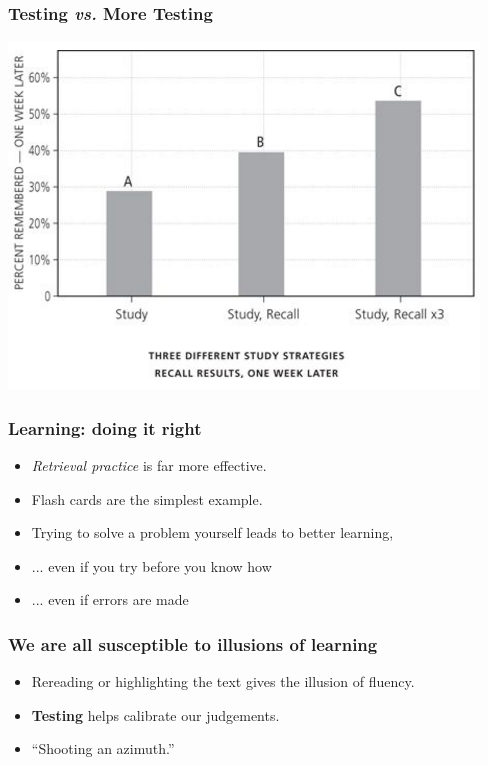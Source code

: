 \documentclass{beamer}
\newcommand{\bi}{\begin{itemize}}
\newcommand{\li}{\item}
\newcommand{\ei}{\end{itemize}}
\newcommand{\bfr}[1]{\begin{frame}[fragile]\frametitle{{ #1 }}}
\begin{document}
\bfr{Testing {\em vs.} More Testing}
\includegraphics[width=\textwidth]{test3times.png}
\end{frame}

\bfr{Learning: doing it right}
\bi
\li {\em Retrieval practice} is far more effective.
\li Flash cards are the simplest example.
\li Trying to solve a problem yourself
leads to better learning,

\li ... even if you try before you know how
\li ... even if errors are made

\ei
\end{frame}



\bfr{We are all susceptible to {\bf illusions} of learning}
\bi
\li Rereading or highlighting 
the text gives the illusion of fluency.
\li {\bf Testing} helps calibrate our judgements.
\li ``Shooting an azimuth.''
\ei
\end{frame}
\end{document}
